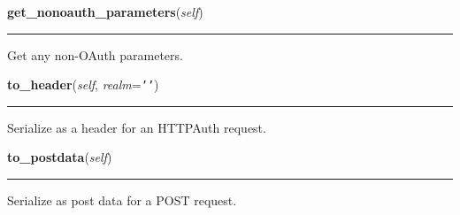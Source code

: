     \label{lib:oauth:OAuthRequest:get_nonoauth_parameters}

    \vspace{0.5ex}

\hspace{.8\funcindent}\begin{boxedminipage}{\funcwidth}

    \raggedright \textbf{get\_nonoauth\_parameters}(\textit{self})

    \vspace{-1.5ex}

    \rule{\textwidth}{0.5\fboxrule}
\setlength{\parskip}{2ex}
    Get any non-OAuth parameters.

\setlength{\parskip}{1ex}
    \end{boxedminipage}

    \label{lib:oauth:OAuthRequest:to_header}

    \vspace{0.5ex}

\hspace{.8\funcindent}\begin{boxedminipage}{\funcwidth}

    \raggedright \textbf{to\_header}(\textit{self}, \textit{realm}={\tt \texttt{'}\texttt{}\texttt{'}})

    \vspace{-1.5ex}

    \rule{\textwidth}{0.5\fboxrule}
\setlength{\parskip}{2ex}
    Serialize as a header for an HTTPAuth request.

\setlength{\parskip}{1ex}
    \end{boxedminipage}

    \label{lib:oauth:OAuthRequest:to_postdata}

    \vspace{0.5ex}

\hspace{.8\funcindent}\begin{boxedminipage}{\funcwidth}

    \raggedright \textbf{to\_postdata}(\textit{self})

    \vspace{-1.5ex}

    \rule{\textwidth}{0.5\fboxrule}
\setlength{\parskip}{2ex}
    Serialize as post data for a POST request.

\setlength{\parskip}{1ex}
    \end{boxedminipage}

